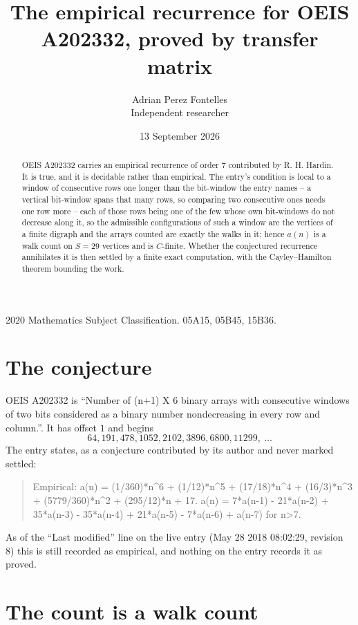 \documentclass[11pt,a4paper]{article}
\title{The empirical recurrence for OEIS A202332, proved by transfer matrix}
\author{Adrian Perez Fontelles\\ \small Independent researcher}
\date{13 September 2026}
\theoremstyle{plain}
\theoremstyle{definition}
\begin{document}
\maketitle

\begin{abstract}
OEIS A202332 carries an empirical recurrence of order $7$ contributed by R. H. Hardin. It is
true, and it is decidable rather than empirical. The entry's condition is local to a window of consecutive rows one longer than the bit-window the entry names -- a vertical bit-window spans that many rows, so comparing two consecutive ones needs one row more -- each of those rows being one of the few whose own bit-windows do not decrease along it, so
the admissible configurations of such a window are the vertices of a finite digraph and the
arrays counted are exactly the walks in it; hence $a(n)$ is a walk count on $S=29$ vertices
and is $C$-finite. Whether the conjectured recurrence annihilates it is then settled by a
finite exact computation, with the Cayley--Hamilton theorem bounding the work.
\end{abstract}

\noindent\small 2020 Mathematics Subject Classification. 05A15, 05B45, 15B36.\normalsize

\section{The conjecture}

OEIS A202332 is ``Number of (n+1) X 6 binary arrays with consecutive windows of two bits considered as a binary number nondecreasing in every row and column.''. It has offset $1$ and begins
\[
64, 191, 478, 1052, 2102, 3896, 6800, 11299,\ \dots
\]
The entry states, as a conjecture contributed by its author and never marked settled:
\begin{quote}
Empirical: a(n) = (1/360)*n\^{}6 + (1/12)*n\^{}5 + (17/18)*n\^{}4 + (16/3)*n\^{}3 + (5779/360)*n\^{}2 + (295/12)*n + 17. a(n) = 7*a(n-1) - 21*a(n-2) + 35*a(n-3) - 35*a(n-4) + 21*a(n-5) - 7*a(n-6) + a(n-7) for n>7.
\end{quote}
As of the ``Last modified'' line on the live entry (May 28 2018 08:02:29, revision 8) this is still
recorded as empirical, and nothing on the entry records it as proved.

\section{The count is a walk count}
\end{document}
